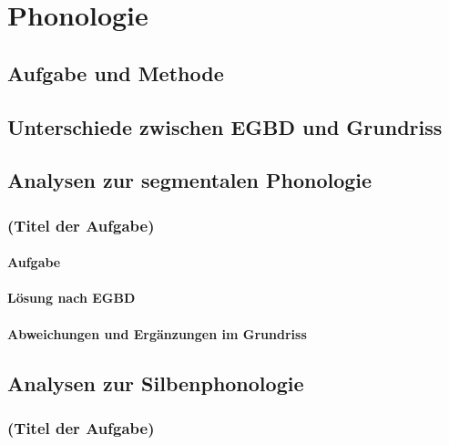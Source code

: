 \chapter{Phonologie}
\label{sec:phonologie}

\section{Aufgabe und Methode}
\label{sec:phonologie:aufgabeundmethoden}

\section{Unterschiede zwischen EGBD und Grundriss}
\label{sec:phonologie:unterschiedezwischenegbdundgrundriss}

\section{Analysen zur segmentalen Phonologie}
\label{sec:phonologie:analysenzursegmentalenphonologie}

\subsection{(Titel der Aufgabe)}

\subsubsection{Aufgabe}

\subsubsection{Lösung nach EGBD}

\subsubsection{Abweichungen und Ergänzungen im Grundriss}


\section{Analysen zur Silbenphonologie}
\label{sec:phonologie:analysenzursilbenphonologie}

\subsection{(Titel der Aufgabe)}

